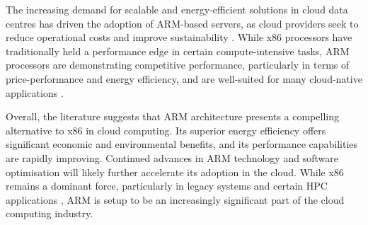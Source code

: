\documentclass[conference]{IEEEtran}  %
\begin{document}
The increasing demand for scalable and energy-efficient solutions in cloud data centres has driven the adoption of ARM-based servers, as cloud providers seek to reduce operational costs and improve sustainability \cite{datacentre_energy}. While x86 processors have traditionally held a performance edge in certain compute-intensive tasks, ARM processors are demonstrating competitive performance, particularly in terms of price-performance and energy efficiency, and are well-suited for many cloud-native applications \cite{ArmCloudComputing}.

Overall, the literature suggests that ARM architecture presents a compelling alternative to x86 in cloud computing. Its superior energy efficiency offers significant economic and environmental benefits, and its performance capabilities are rapidly improving. Continued advances in ARM technology and software optimisation will likely further accelerate its adoption in the cloud.
While x86 remains a dominant force, particularly in legacy systems and certain HPC applications \cite{arm_database}, ARM is setup to be an increasingly significant part of the cloud computing industry.


\end{document}
